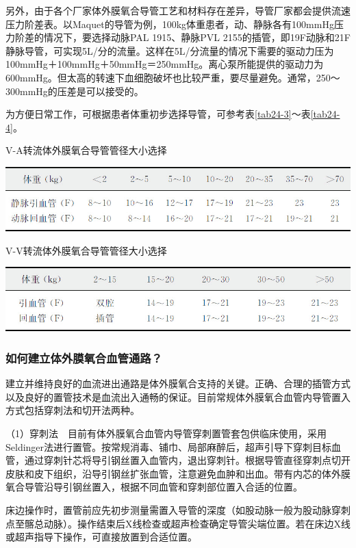 另外，由于各个厂家体外膜氧合导管工艺和材料存在差异，导管厂家都会提供流速压力阶差表。以Maquet的导管为例，100kg体重患者，动、静脉各有100mmHg压力阶差的情况下，要选择动脉PAL
1915、静脉PVL
2155的插管，即19F动脉和21F静脉导管，可实现5L/分的流量。这样在5L/分流量的情况下需要的驱动力压为100mmHg＋100mmHg＋50mmHg＝250mmHg。离心泵所能提供的驱动力为600mmHg。但太高的转速下血细胞破坏也比较严重，要尽量避免。通常，250～300mmHg的压差是可以接受的。

为方便日常工作，可根据患者体重初步选择导管，可参考表\ref{tab24-3}～表\ref{tab24-4}。

\begin{table}[htbp]
\centering
\caption{V-A转流体外膜氧合导管管径大小选择}
\label{tab24-3}
\includegraphics{./images/Image00284.jpg}
\end{table}

\begin{table}[htbp]
\centering
\caption{V-V转流体外膜氧合导管管径大小选择}
\label{tab24-4}
\includegraphics{./images/Image00285.jpg}
\end{table}

\subsubsection{如何建立体外膜氧合血管通路？}

建立并维持良好的血流进出通路是体外膜氧合支持的关键。正确、合理的插管方式以及良好的置管技术是血流出入通畅的保证。目前常规体外膜氧合血管内导管置入方式包括穿刺法和切开法两种。

（1）穿刺法　目前有体外膜氧合血管内导管穿刺置管套包供临床使用，采用Seldinger法进行置管。按常规消毒、铺巾、局部麻醉后，超声引导下穿刺目标血管，通过穿刺针芯将导引钢丝置入血管内，退出穿刺针。根据导管直径穿刺点切开皮肤和皮下组织，沿导引钢丝扩张血管，注意避免血肿和出血。带有内芯的体外膜氧合导管沿导引钢丝置入，根据不同血管和穿刺部位置入合适的位置。

床边操作时，置管前应先初步测量需置入导管的深度（如股动脉一般为股动脉穿刺点至髂总动脉）。操作结束后X线检查或超声检查确定导管尖端位置。若在床边X线或超声指导下操作，可直接放置到合适位置。

